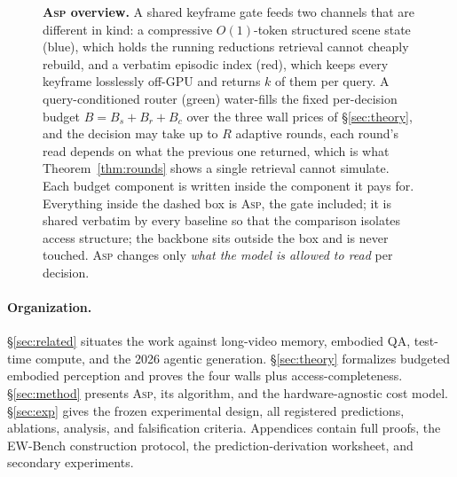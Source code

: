 \documentclass[10pt]{article}
\theoremstyle{definition}
\theoremstyle{plain}
\newcommand{\ASP}{\textsc{Asp}}
\newcommand{\cs}{\mathcal{C}_{\mathrm{s}}}
\newcommand{\cv}{\mathcal{C}_{\mathrm{v}}}
\newcommand{\A}{\mathcal{A}}
\begin{document}
\begin{figure}[!t]
\caption{\textbf{\ASP{} overview.} A shared keyframe gate feeds two channels that are
different in kind: a compressive $O(1)$-token structured scene state (blue), which holds the
running reductions retrieval cannot cheaply rebuild, and a verbatim episodic index (red),
which keeps every keyframe losslessly off-GPU and returns $k$ of them per query. A
query-conditioned router (green) water-fills the fixed per-decision budget
$B=B_s{+}B_r{+}B_c$ over the three wall prices of \S\ref{sec:theory}, and the decision may
take up to $R$ adaptive rounds, each round's read depends on what the previous one
returned, which is what Theorem~\ref{thm:rounds} shows a single retrieval cannot simulate.
Each budget component is written inside the component it pays for. Everything inside the
dashed box is \ASP{}, the gate included; it is shared verbatim by every baseline so that
the comparison isolates access structure; the backbone sits outside the box and is never
touched. \ASP{} changes only \emph{what the model is allowed to read} per decision.}
\label{fig:overview}
\end{figure}


\paragraph{Organization.} \S\ref{sec:related} situates the work against long-video memory, embodied QA, test-time compute, and the 2026 agentic generation. \S\ref{sec:theory} formalizes budgeted embodied perception and proves the four walls plus access-completeness. \S\ref{sec:method} presents \ASP{}, its algorithm, and the hardware-agnostic cost model. \S\ref{sec:exp} gives the frozen experimental design, all registered predictions, ablations, analysis, and falsification criteria. Appendices contain full proofs, the EW-Bench construction protocol, the prediction-derivation worksheet, and secondary experiments.
\end{document}
